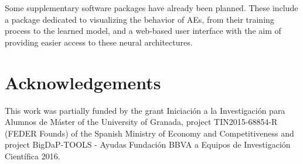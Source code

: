 \documentclass[
	fontsize=11pt, %
	twoside=false, %
	open=any, %
	secnumdepth=1, %
]{kaobook}
\begin{document}
Some supplementary software packages have already been planned. These include a package dedicated to visualizing the behavior of AEs, from their training process to the learned model, and a web-based user interface with the aim of providing easier access to these neural architectures.


\section*{Acknowledgements}
\label{sec.acknowledgements}

This work was partially funded by the grant Iniciaci{\'o}n a la Investigaci{\'o}n para Alumnos de M{\'a}ster of the University of Granada, project TIN2015-68854-R (FEDER Founds) of the Spanish Ministry of Economy and Competitiveness and project BigDaP-TOOLS - Ayudas
Fundaci{\'o}n BBVA a Equipos de Investigaci{\'o}n  Cient{\'i}fica
2016.



% 
%
\end{document}
